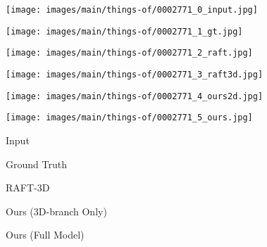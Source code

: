 \documentclass[10pt,twocolumn,letterpaper]{article}
\begin{document}
\begin{figure*}
    \begin{subfigure}[b]{0.165\linewidth}
        \texttt{[image: images/main/things-of/0002771\_0\_input.jpg]}
    \end{subfigure}\hfill
    \begin{subfigure}[b]{0.165\linewidth}
        \texttt{[image: images/main/things-of/0002771\_1\_gt.jpg]}
    \end{subfigure}\hfill
    \begin{subfigure}[b]{0.165\linewidth}
        \texttt{[image: images/main/things-of/0002771\_2\_raft.jpg]}
    \end{subfigure}\hfill
    \begin{subfigure}[b]{0.165\linewidth}
        \texttt{[image: images/main/things-of/0002771\_3\_raft3d.jpg]}
    \end{subfigure}\hfill
    \begin{subfigure}[b]{0.165\linewidth}
        \texttt{[image: images/main/things-of/0002771\_4\_ours2d.jpg]}
    \end{subfigure}\hfill
    \begin{subfigure}[b]{0.165\linewidth}
        \texttt{[image: images/main/things-of/0002771\_5\_ours.jpg]}
    \end{subfigure}\hfill
    
\vspace{3pt}
    \begin{subfigure}[b]{0.198\linewidth}
        \caption{Input}
    \end{subfigure}\hfill
    \begin{subfigure}[b]{0.198\linewidth}
        \caption{Ground Truth}
    \end{subfigure}\hfill
    \begin{subfigure}[b]{0.198\linewidth}
        \caption{RAFT-3D}
    \end{subfigure}\hfill
    \begin{subfigure}[b]{0.198\linewidth}
        \caption{Ours (3D-branch Only)}
    \end{subfigure}\hfill
    \begin{subfigure}[b]{0.198\linewidth}
        \caption{Ours (Full Model)}
    \end{subfigure}\hfill
    

\end{figure*}
\end{document}
